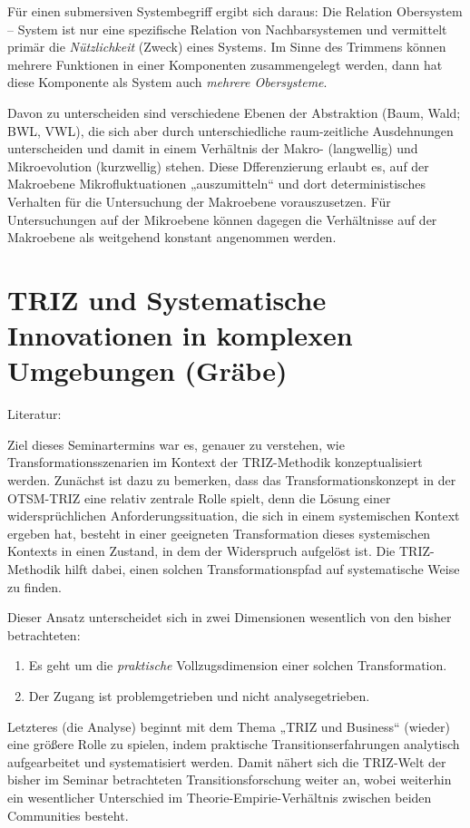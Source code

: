 \documentclass[11pt,a4paper]{article}
\begin{document}
Für einen submersiven Systembegriff ergibt sich daraus: Die Relation
Obersystem -- System ist nur eine spezifische Relation von Nachbarsystemen und
vermittelt primär die \emph{Nützlichkeit} (Zweck) eines Systems. Im Sinne des
Trimmens können mehrere Funktionen in einer Komponenten zusammengelegt werden,
dann hat diese Komponente als System auch \emph{mehrere Obersysteme}.

Davon zu unterscheiden sind verschiedene Ebenen der Abstraktion (Baum, Wald;
BWL, VWL), die sich aber durch unterschiedliche raum-zeitliche Ausdehnungen
unterscheiden und damit in einem Verhältnis der Makro- (langwellig) und
Mikroevolution (kurzwellig) stehen. Diese Dfferenzierung erlaubt es, auf der
Makroebene Mikrofluktuationen „auszumitteln“ und dort deterministisches
Verhalten für die Untersuchung der Makroebene vorauszusetzen. Für
Untersuchungen auf der Mikroebene können dagegen die Verhältnisse auf der
Makroebene als weitgehend konstant angenommen werden.

\section{ TRIZ und Systematische Innovationen in komplexen
  Umgebungen (Gräbe)} 

Literatur: \cite{Mann2019}

Ziel dieses Seminartermins war es, genauer zu verstehen, wie
Transformationsszenarien im Kontext der TRIZ-Methodik konzeptualisiert werden.
Zunächst ist dazu zu bemerken, dass das Transformationskonzept in der
OTSM-TRIZ eine relativ zentrale Rolle spielt, denn die Lösung einer
widersprüchlichen Anforderungssituation, die sich in einem systemischen
Kontext ergeben hat, besteht in einer geeigneten Transformation dieses
systemischen Kontexts in einen Zustand, in dem der Widerspruch aufgelöst ist.
Die TRIZ-Methodik hilft dabei, einen solchen Transformationspfad auf
systematische Weise zu finden.

Dieser Ansatz unterscheidet sich in zwei Dimensionen wesentlich von den bisher
betrachteten:
\begin{enumerate}[noitemsep]
\item Es geht um die \emph{praktische} Vollzugsdimension einer solchen
  Transformation.
\item Der Zugang ist problemgetrieben und nicht analysegetrieben.
\end{enumerate}

Letzteres (die Analyse) beginnt mit dem Thema „TRIZ und Business“ (wieder)
eine größere Rolle zu spielen, indem praktische Transitionserfahrungen
analytisch aufgearbeitet und systematisiert werden. Damit nähert sich die
TRIZ-Welt der bisher im Seminar betrachteten Transitionsforschung weiter an,
wobei weiterhin ein wesentlicher Unterschied im Theorie-Empirie-Verhältnis
zwischen beiden Communities besteht.
\end{document}
